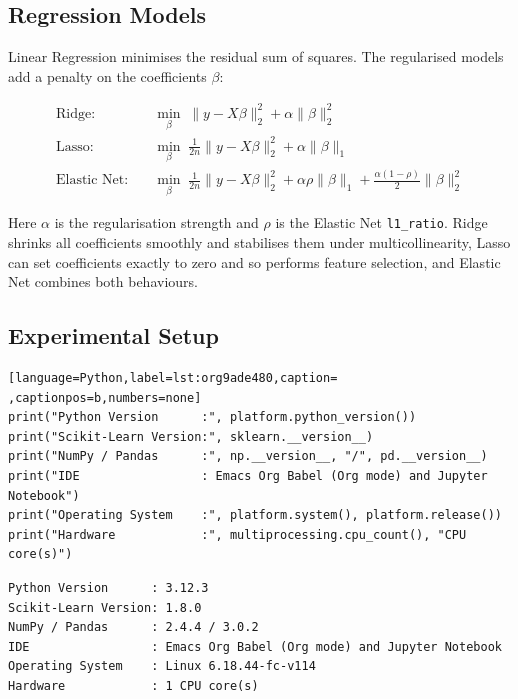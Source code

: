 \documentclass[11pt]{article}
\begin{document}
\subsection*{Regression Models}
\label{sec:org1b6b4bf}


Linear Regression minimises the residual sum of squares. The regularised models add a
penalty on the coefficients \(\beta\):

\begin{align}
\text{Ridge:}\quad & \min_\beta \; \lVert y - X\beta\rVert_2^2 + \alpha \lVert\beta\rVert_2^2 \\
\text{Lasso:}\quad & \min_\beta \; \tfrac{1}{2n}\lVert y - X\beta\rVert_2^2 + \alpha \lVert\beta\rVert_1 \\
\text{Elastic Net:}\quad & \min_\beta \; \tfrac{1}{2n}\lVert y - X\beta\rVert_2^2 + \alpha\rho \lVert\beta\rVert_1 + \tfrac{\alpha(1-\rho)}{2}\lVert\beta\rVert_2^2
\end{align}

Here \(\alpha\) is the regularisation strength and \(\rho\) is the Elastic Net \texttt{l1\_ratio}. Ridge
shrinks all coefficients smoothly and stabilises them under multicollinearity, Lasso can set
coefficients exactly to zero and so performs feature selection, and Elastic Net combines
both behaviours.

\subsection*{Experimental Setup}
\label{sec:orga2a229a}

\begin{lstlisting}[language=Python,label=lst:org9ade480,caption= ,captionpos=b,numbers=none]
print("Python Version      :", platform.python_version())
print("Scikit-Learn Version:", sklearn.__version__)
print("NumPy / Pandas      :", np.__version__, "/", pd.__version__)
print("IDE                 : Emacs Org Babel (Org mode) and Jupyter Notebook")
print("Operating System    :", platform.system(), platform.release())
print("Hardware            :", multiprocessing.cpu_count(), "CPU core(s)")
\end{lstlisting}

\begin{verbatim}
Python Version      : 3.12.3
Scikit-Learn Version: 1.8.0
NumPy / Pandas      : 2.4.4 / 3.0.2
IDE                 : Emacs Org Babel (Org mode) and Jupyter Notebook
Operating System    : Linux 6.18.44-fc-v114
Hardware            : 1 CPU core(s)
\end{verbatim}
\end{document}
